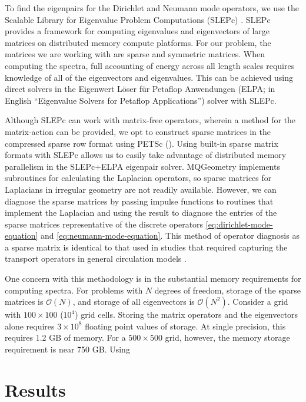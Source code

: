 \documentclass[draft]{agujournal2019}
\begin{document}
To find the eigenpairs for the Dirichlet and Neumann mode operators, we use the Scalable Library for Eigenvalue Problem Computations (SLEPc) \cite{Hernandez2005}. SLEPc provides a framework for computing eigenvalues and eigenvectors of large matrices on distributed memory compute platforms. For our problem, the matrices we are working with are sparse and symmetric matrices. When computing the spectra, full accounting of energy across all length scales requires knowledge of all of the eigenvectors and eigenvalues. This can be achieved using direct solvers in the Eigenwert Löser für Petaflop Anwendungen (ELPA; in English “Eigenvalue Solvers for Petaflop Applications”) \cite{Marek2014,Aukenthaler2011} solver with SLEPc. 

Although SLEPc can work with matrix-free operators, wherein a method for the matrix-action can be provided, we opt to construct sparse matrices in the compressed sparse row format using PETSc (). Using built-in sparse matrix formats with SLEPc allows us to easily take advantage of distributed memory parallelism in the SLEPc+ELPA eigenpair solver. MQGeometry implements subroutines for calculating the Laplacian operators, so sparse matrices for Laplacians in irregular geometry are not readily available. However, we can diagnose the sparse matrices by passing impulse functions to routines that implement the Laplacian and using the result to diagnose the entries of the sparse matrices representative of the discrete operators \eqref{eq:dirichlet-mode-equation} and \eqref{eq:neumann-mode-equation}. This method of operator diagnosis as a sparse matrix is identical to that used in studies that required capturing the transport operators in general circulation models \cite{schoonover2023}.

One concern with this methodology is in the substantial memory requirements for computing spectra. For problems with $N$ degrees of freedom, storage of the sparse matrices is $\mathcal{O}(N)$, and storage of all eigenvectors is $\mathcal{O}(N^2)$. Consider a grid with $100 \times 100$ ($10^4$) grid cells. Storing the matrix operators and the eigenvectors alone requires $3 \times 10^8$ floating point values of storage. At single precision, this requires 1.2 GB of memory. For a $500 \times 500$ grid, however, the memory storage requirement is near 750 GB. Using 


\section{Results}
\end{document}
